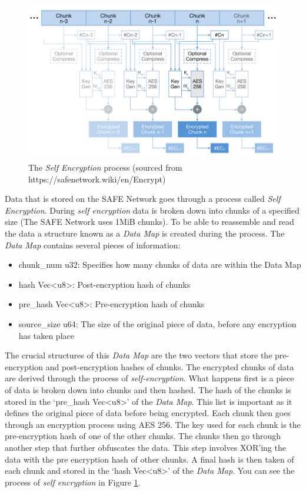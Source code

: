 \begin{figure}[h]
	\begin{center}
		\includegraphics[width=\textwidth]{diagrams/self-encryption}
		\caption{The \textit{Self Encryption} process (sourced from https://safenetwork.wiki/en/Encrypt)}
		\label{fig:self-encryption}
	\end{center}
\end{figure}

Data that is stored on the SAFE Network goes through a process called \textit{Self Encryption}\cite{irvine2010self}. During \textit{self encryption} data is broken down into chunks of a specified size (The SAFE Network uses 1MiB chunks). To be able to reassemble and read the data a structure known as a \textit{Data Map} is created during the process. The \textit{Data Map} contains several pieces of information:

\begin{itemize}
	\item chunk\_num u32: Specifies how many chunks of data are within the Data Map
	\item hash Vec\textless u8\textgreater: Post-encryption hash of chunks
	\item pre\_hash Vec\textless u8\textgreater: Pre-encryption hash of chunks
	\item source\_size u64: The size of the original piece of data, before any encryption has taken place
\end{itemize}

The crucial structures of this \textit{Data Map} are the two vectors that store the pre-encryption and post-encryption hashes of chunks. The encrypted chunks of data are derived through the process of \textit{self-encryption}. What happens first is a piece of data is broken down into chunks and then hashed. The hash of the chunks is stored in the `pre\_hash Vec\textless u8\textgreater' of the \textit{Data Map}. This list is important as it defines the original piece of data before being encrypted. Each chunk then goes through an encryption process using AES 256. The key used for each chunk is the pre-encryption hash of one of the other chunks. The chunks then go through another step that further obfuscates the data. This step involves XOR'ing the data with the pre encryption hash of other chunks. A final hash is then taken of each chunk and stored in the `hash Vec\textless u8\textgreater' of the \textit{Data Map}. You can see the process of \textit{self encryption} in Figure \ref{fig:self-encryption}.

